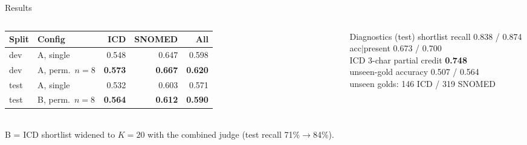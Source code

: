 \documentclass[aspectratio=169,10pt]{beamer}
\newcommand{\hl}[1]{\textcolor{accent}{\textbf{#1}}}
\begin{document}
\begin{frame}{Results}
\begin{columns}[T]
\begin{column}{0.55\textwidth}
\small
\begin{tabular}{@{}llrrr@{}}
\toprule
Split & Config & ICD & SNOMED & All\\
\midrule
dev & A, single & 0.548 & 0.647 & 0.598\\
dev & A, perm.\ $n{=}8$ & \hl{0.573} & \hl{0.667} & \hl{0.620}\\
test & A, single & 0.532 & 0.603 & 0.571\\
test & B, perm.\ $n{=}8$ & \hl{0.564} & \hl{0.612} & \hl{0.590}\\
\bottomrule
\end{tabular}\\[2mm]
{\footnotesize B = ICD shortlist widened to $K{=}20$ with the combined judge (test recall 71\%$\rightarrow$84\%).}
\end{column}
\begin{column}{0.42\textwidth}
\begin{block}{Diagnostics (test)}
\small
shortlist recall 0.838 / 0.874\\
acc$|$present 0.673 / 0.700\\
ICD 3-char partial credit \hl{0.748}\\
unseen-gold accuracy 0.507 / 0.564\\[1mm]
{\footnotesize unseen golds: 146 ICD / 319 SNOMED}
\end{block}
\end{column}
\end{columns}
\end{frame}
\end{document}
